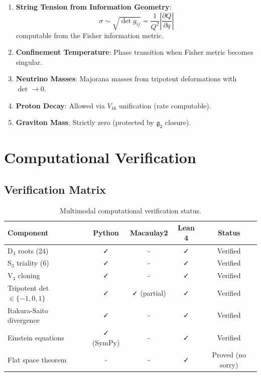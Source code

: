 \documentclass[12pt,a4paper]{article}
\theoremstyle{definition}
\theoremstyle{axiom}
\newcommand{\g}{\mathfrak{g}}
\begin{document}
\begin{enumerate}
\item \textbf{String Tension from Information Geometry}:
\begin{equation}
\sigma \sim \sqrt{\det g_{ij}} = \frac{1}{Q^2} \left|\frac{\partial Q}{\partial q}\right|
\end{equation}
computable from the Fisher information metric.

\item \textbf{Confinement Temperature}: Phase transition when Fisher metric becomes singular.

\item \textbf{Neutrino Masses}: Majorana masses from tripotent deformations with $\det \to 0$.

\item \textbf{Proton Decay}: Allowed via $V_{16}$ unification (rate computable).

\item \textbf{Graviton Mass}: Strictly zero (protected by $\g_2$ closure).
\end{enumerate}

\newpage

\section{Computational Verification}

\subsection{Verification Matrix}

\begin{table}[h]
\centering
\begin{tabular}{|l|c|c|c|c|}
\hline
\textbf{Component} & \textbf{Python} & \textbf{Macaulay2} & \textbf{Lean 4} & \textbf{Status} \\ \hline
D$_4$ roots (24) & ✓ & - & ✓ & Verified \\ \hline
S$_3$ triality (6) & ✓ & - & ✓ & Verified \\ \hline
V$_4$ cloning & ✓ & - & ✓ & Verified \\ \hline
Tripotent det $\in \{-1,0,1\}$ & ✓ & ✓ (partial) & ✓ & Verified \\ \hline
Itakura-Saito divergence & ✓ & - & ✓ & Verified \\ \hline
Einstein equations & ✓ (SymPy) & - & ✓ & Verified \\ \hline
Flat space theorem & - & - & ✓ & Proved (no sorry) \\ \hline
\end{tabular}
\caption{Multimodal computational verification status.}
\end{table}
\end{document}
